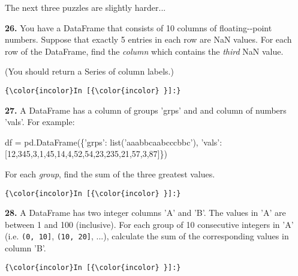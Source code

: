 \documentclass[11pt]{article}
\newenvironment{Shaded}{}{}
\newcommand{\DecValTok}[1]{\textcolor[rgb]{0.25,0.63,0.44}{{#1}}}
\newcommand{\StringTok}[1]{\textcolor[rgb]{0.25,0.44,0.63}{{#1}}}
\newcommand{\NormalTok}[1]{{#1}}
\newcommand{\OperatorTok}[1]{\textcolor[rgb]{0.40,0.40,0.40}{{#1}}}
\newcommand{\BuiltInTok}[1]{{#1}}
\begin{document}
    The next three puzzles are slightly harder...

\textbf{26.} You have a DataFrame that consists of 10 columns of
floating-\/-point numbers. Suppose that exactly 5 entries in each row
are NaN values. For each row of the DataFrame, find the \emph{column}
which contains the \emph{third} NaN value.

(You should return a Series of column labels.)

    \begin{Verbatim}[commandchars=\\\{\}]
{\color{incolor}In [{\color{incolor} }]:} 
\end{Verbatim}


    \textbf{27.} A DataFrame has a column of groups 'grps' and and column of
numbers 'vals'. For example:

\begin{Shaded}
\begin{Highlighting}[]
\NormalTok{df }\OperatorTok{=}\NormalTok{ pd.DataFrame(\{}\StringTok{'grps'}\NormalTok{: }\BuiltInTok{list}\NormalTok{(}\StringTok{'aaabbcaabcccbbc'}\NormalTok{), }
                   \StringTok{'vals'}\NormalTok{: [}\DecValTok{12}\NormalTok{,}\DecValTok{345}\NormalTok{,}\DecValTok{3}\NormalTok{,}\DecValTok{1}\NormalTok{,}\DecValTok{45}\NormalTok{,}\DecValTok{14}\NormalTok{,}\DecValTok{4}\NormalTok{,}\DecValTok{52}\NormalTok{,}\DecValTok{54}\NormalTok{,}\DecValTok{23}\NormalTok{,}\DecValTok{235}\NormalTok{,}\DecValTok{21}\NormalTok{,}\DecValTok{57}\NormalTok{,}\DecValTok{3}\NormalTok{,}\DecValTok{87}\NormalTok{]\})}
\end{Highlighting}
\end{Shaded}

For each \emph{group}, find the sum of the three greatest values.

    \begin{Verbatim}[commandchars=\\\{\}]
{\color{incolor}In [{\color{incolor} }]:} 
\end{Verbatim}


    \textbf{28.} A DataFrame has two integer columns 'A' and 'B'. The values
in 'A' are between 1 and 100 (inclusive). For each group of 10
consecutive integers in 'A' (i.e. \texttt{(0,\ 10{]}},
\texttt{(10,\ 20{]}}, ...), calculate the sum of the corresponding
values in column 'B'.

    \begin{Verbatim}[commandchars=\\\{\}]
{\color{incolor}In [{\color{incolor} }]:} 
\end{Verbatim}
\end{document}
